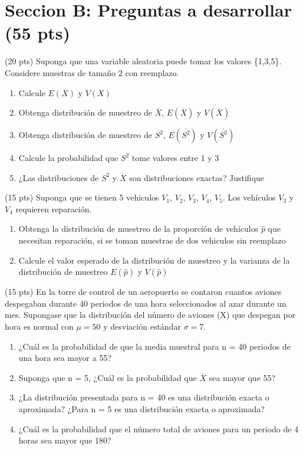 \documentclass[addpoints]{exam}
\theoremstyle{mytheor}
\begin{document}
  \section*{Seccion B: Preguntas a desarrollar (55 pts)}
  
  
  \begin{questions} 
  \question (20 pts) Suponga que una variable aleatoria puede tomar los valores \{1,3,5\}. Considere muestras de tamaño 2 con reemplazo.
  
  \begin{enumerate}
  \item Calcule $E(X)$ y $V(X)$
  \item Obtenga distribución de muestreo de $\overline{X}$, $E(\overline{X})$ y $V(\overline{X})$
  \item Obtenga distribución de muestreo de $S^2$, $E(\overline{S^2})$ y $V(\overline{S^2})$
  \item Calcule la probabilidad que $S^2$ tome valores entre 1 y 3
  \item ¿Las distribuciones de $S^2$ y $\overline{X}$ son distribuciones exactas?
  Justifique
  \end{enumerate}
  
  \question (15 pts) Suponga que se tienen 5 vehiculos $V_1$, $V_2$, $V_3$, $V_4$, $V_5$. Los vehículos $V_3$ y $V_4$ requieren reparación.

  \begin{enumerate}
  \item Obtenga la distribución de muestreo de la proporción de vehículos $\hat{p}$ que necesitan reparación, si se toman muestras de dos vehiculos sin reemplazo
  \item Calcule el valor esperado de la distribución de muestreo y la varianza de la distribución de muestreo $E(\hat{p})$ y $V(\hat{p})$
  \end{enumerate}
  
  
  \question (15 pts) 
  En la torre de control de un aeropuerto se contaron cuantos aviones despegaban durante 40 periodos de una hora seleccionados al azar durante un mes. Supongase que la distribución del número de aviones (X) que despegan por hora es normal con $\mu = 50$ y desviación estándar $\sigma=7$.
  
  \begin{enumerate}
  \item ¿Cuál es la probabilidad de que la media muestral para n = 40 periodos de una hora sea mayor a 55?
  \item Suponga que n = 5, ¿Cuál es la probabilidad que $\bar{X}$ sea mayor que 55?
  \item ¿La distribución presentada para n = 40 es una distribución exacta o aproximada? ¿Para n = 5 es una distribución exacta o aproximada?
  \item ¿Cuál es la probabilidad que el número total de aviones para un periodo de 4 horas sea mayor que 180?
  \end{enumerate}


\end{questions}
\end{document}
